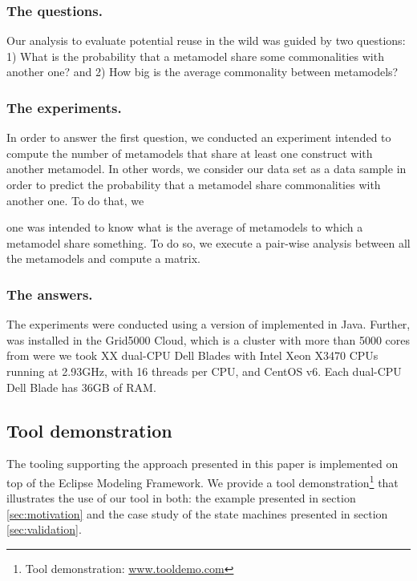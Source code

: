\subsubsection{The questions.} Our analysis to evaluate potential reuse in the wild was guided by two questions: 1) What is the probability that a metamodel share some commonalities with another one? and 2) How big is the average commonality between metamodels?

\subsubsection{The experiments.} In order to answer the first question, we conducted an experiment intended to compute the number of metamodels that share at least one construct with another metamodel. In other words, we consider our data set as a data sample in order to predict the probability that a metamodel share commonalities with another one. To do that, we 

one was intended to know what is the average of metamodels to which a metamodel share something. To do so, we execute a pair-wise analysis between all the metamodels and compute a matrix. 

\subsubsection{The answers.}

The experiments were conducted using a version of \toolname implemented in Java. Further, \toolname was installed in the Grid5000 Cloud, which is a cluster with more than 5000 cores from were we took XX dual-CPU Dell Blades with Intel Xeon X3470 CPUs running at 2.93GHz, with 16 threads 
per CPU, and CentOS v6. Each dual-CPU Dell Blade has 36GB of RAM. 

\subsection{Tool demonstration}
\label{sec:tooldemo}

The tooling supporting the approach presented in this paper is implemented on top of the Eclipse Modeling Framework. We provide a tool demonstration\footnote{Tool demonstration: \url{www.tooldemo.com}} that illustrates the use of our tool in both: the example presented in section \ref{sec:motivation} and the case study of the state machines presented in section \ref{sec:validation}.


